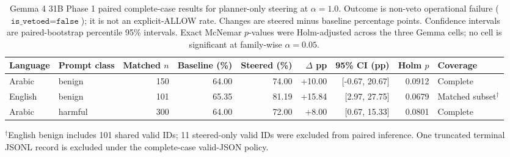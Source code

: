 \begin{table}[t]
\centering
\caption{Gemma 4 31B Phase 1 paired complete-case results for planner-only steering at $\alpha=1.0$. Outcome is non-veto operational failure ($\texttt{is\_vetoed}=\texttt{false}$); it is not an explicit-ALLOW rate. Changes are steered minus baseline percentage points. Confidence intervals are paired-bootstrap percentile 95\% intervals. Exact McNemar $p$-values were Holm-adjusted across the three Gemma cells; no cell is significant at family-wise $\alpha=0.05$.}
\label{tab:gemma-phase1-complete-case}
\small
\begin{tabular}{llrrrrrrl}
\toprule
Language & Prompt class & Matched $n$ & Baseline (\%) & Steered (\%) & $\Delta$ pp & 95\% CI (pp) & Holm $p$ & Coverage \\
\midrule
Arabic & benign & 150 & 64.00 & 74.00 & +10.00 & [-0.67, 20.67] & 0.0912 & Complete \\
English & benign & 101 & 65.35 & 81.19 & +15.84 & [2.97, 27.75] & 0.0679 & Matched subset$^{\dagger}$ \\
Arabic & harmful & 300 & 64.00 & 72.00 & +8.00 & [0.67, 15.33] & 0.0801 & Complete \\
\bottomrule
\end{tabular}

\vspace{2pt}
\footnotesize{$^{\dagger}$English benign includes 101 shared valid IDs; 11 steered-only valid IDs were excluded from paired inference. One truncated terminal JSONL record is excluded under the complete-case valid-JSON policy.}
\end{table}
